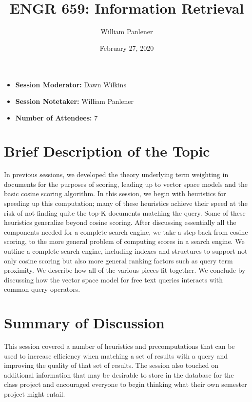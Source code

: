 \documentclass{article}
\title{ENGR 659: Information Retrieval}
\author{William Panlener}
\date{February 27, 2020}
\begin{document}
\maketitle

\begin{itemize}[leftmargin=*,noitemsep]
  \item[] \textbf{Session Moderator: } Dawn Wilkins
  \item[] \textbf{Session Notetaker: } William Panlener
  \item[] \textbf{Number of Attendees: } 7
\end{itemize}




\section{Brief Description of the Topic}

In previous sessions, we developed the theory underlying term weighting in documents for the purposes of scoring, leading up to vector space models and the basic cosine scoring algorithm. In this session, we begin with heuristics for speeding up this computation; many of these heuristics achieve their speed at the risk of not finding quite the top-K documents matching the query. Some of these heuristics generalize beyond cosine scoring. After discussing essentially all the components needed for a complete search engine, we take a step back from cosine scoring, to the more general problem of computing scores in a search engine. We outline a complete search engine, including indexes and structures to support not only cosine scoring but also more general ranking factors such as query term proximity. We describe how all of the various pieces fit together. We conclude by discussing how the vector space model for free text queries interacts with common query operators.

\section{Summary of Discussion}

This session covered a number of heuristics and precomputations that can be used to increase efficiency when matching a set of results with a query and improving the quality of that set of results. The session also touched on additional information that may be desirable to store in the database for the class project and encouraged everyone to begin thinking what their own semester project might entail.
\end{document}

